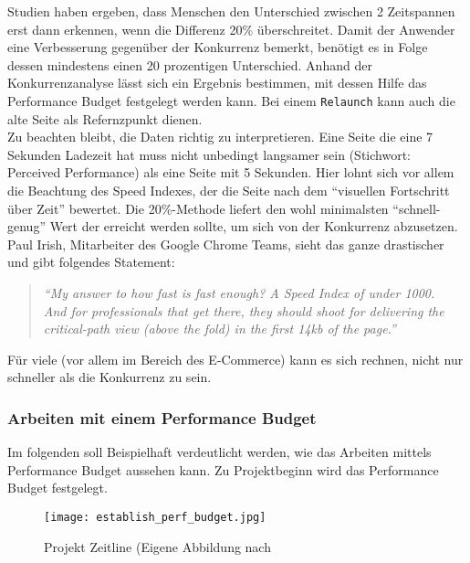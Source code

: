 				Studien haben ergeben, dass Menschen den Unterschied zwischen 2 Zeitspannen erst dann erkennen, wenn die Differenz 20\% überschreitet.\autocite{seow09} Damit der Anwender eine Verbesserung gegenüber der Konkurrenz bemerkt, benötigt es in Folge dessen mindestens einen 20 prozentigen Unterschied. Anhand der Konkurrenzanalyse lässt sich ein Ergebnis bestimmen, mit dessen Hilfe das Performance Budget festgelegt werden kann. Bei einem \texttt{Relaunch} kann auch die alte Seite als Refernzpunkt dienen.\\
				Zu beachten bleibt, die Daten richtig zu interpretieren. Eine Seite die eine 7 Sekunden Ladezeit hat muss nicht unbedingt langsamer sein (Stichwort: Perceived Performance) als eine Seite mit 5 Sekunden. Hier lohnt sich vor allem die Beachtung des Speed Indexes, der die Seite nach dem "`visuellen Fortschritt über Zeit"' bewertet. Die 20\%-Methode liefert den wohl minimalsten "`schnell-genug"' Wert der erreicht werden sollte, um sich von der Konkurrenz abzusetzen.\\
				Paul Irish, Mitarbeiter des Google Chrome Teams, sieht das ganze drastischer und gibt folgendes Statement:
				\begin{quote}
					\textit{"`My answer to how fast is fast enough? A Speed Index of under 1000.\\
					And for professionals that get there, they should shoot for delivering the critical-path view (above the fold) in the first 14kb of the page."'} \autocite{irish14}
				\end{quote}
				Für viele (vor allem im Bereich des E-Commerce) kann es sich rechnen, nicht nur schneller als die Konkurrenz zu sein.

		\subsubsection{Arbeiten mit einem Performance Budget} %
		\label{ssub:arbeiten_mit_einem_performance_budget}
			Im folgenden soll Beispielhaft verdeutlicht werden, wie das Arbeiten mittels Performance Budget aussehen kann. Zu Projektbeginn wird das Performance Budget festgelegt.

			\begin{figure}[htbp]
				\begin{center}
					\texttt{[image: establish\_perf\_budget.jpg]}
					\caption{Projekt Zeitline (Eigene Abbildung nach \autocite[p. 58]{kovalcin15}}
					\label{fig:establish_perf_budget}
				\end{center}
			\end{figure}
			
